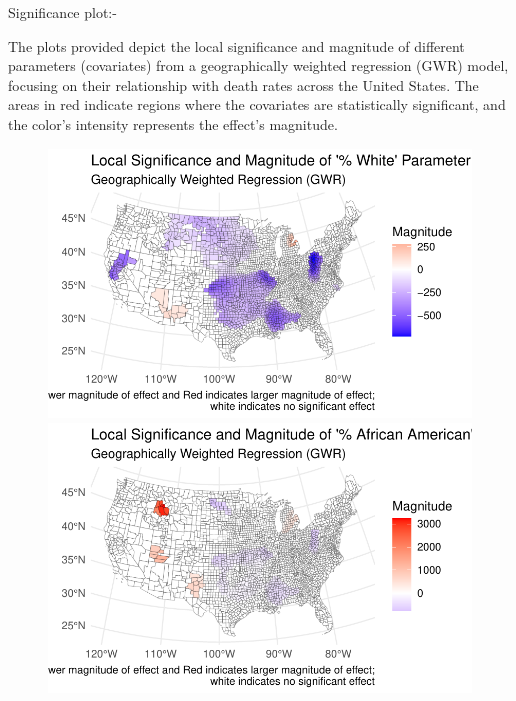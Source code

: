 \documentclass[
]{article}
\begin{document}
Significance plot:-~

The plots provided depict the local significance and magnitude of
different parameters (covariates) from a geographically weighted
regression (GWR) model, focusing on their relationship with death rates
across the United States. The areas in red indicate regions where the
covariates are statistically significant, and the color's intensity
represents the effect's magnitude.

\begin{figure}

\begin{minipage}{0.50\linewidth}
\includegraphics{report_files/figure-pdf/unnamed-chunk-4-1.pdf}\end{minipage}%
%
\begin{minipage}{0.50\linewidth}
\includegraphics{report_files/figure-pdf/unnamed-chunk-4-2.pdf}\end{minipage}%
\newline

\end{figure}
\end{document}
